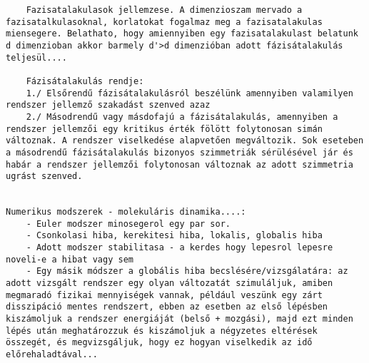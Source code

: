 \begin{verbatim}
	Fazisatalakulasok jellemzese. A dimenzioszam mervado a fazisatalkulasoknal, korlatokat fogalmaz meg a fazisatalakulas miensegere. Belathato, hogy amiennyiben egy fazisatalakulast belatunk d dimenzioban akkor barmely d'>d dimenzióban adott fázisátalakulás teljesül....
	
	Fázisátalakulás rendje:
	1./ Elsőrendű fázisátalakulásról beszélünk amennyiben valamilyen rendszer jellemző szakadást szenved azaz 
	2./ Másodrendű vagy másdofajú a fázisátalakulás, amennyiben a rendszer jellemzői egy kritikus érték fölött folytonosan simán változnak. A rendszer viselkedése alapvetően megváltozik. Sok eseteben a másodrendű fázisátalakulás bizonyos szimmetriák sérülésével jár és habár a rendszer jellemzői folytonosan változnak az adott szimmetria ugrást szenved. 


Numerikus modszerek - molekuláris dinamika....:
	- Euler modszer minosegerol egy par sor. 
	- Csonkolasi hiba, kerekitesi hiba, lokalis, globalis hiba
	- Adott modszer stabilitasa - a kerdes hogy lepesrol lepesre noveli-e a hibat vagy sem
	- Egy másik módszer a globális hiba becslésére/vizsgálatára: az adott vizsgált rendszer egy olyan változatát szimuláljuk, amiben megmaradó fizikai mennyiségek vannak, például veszünk egy zárt disszipáció mentes rendszert, ebben az esetben az első lépésben kiszámoljuk a rendszer energiáját (belső + mozgási), majd ezt minden lépés után meghatározzuk és kiszámoljuk a négyzetes eltérések összegét, és megvizsgáljuk, hogy ez hogyan viselkedik az idő előrehaladtával...
 	

\end{verbatim}
